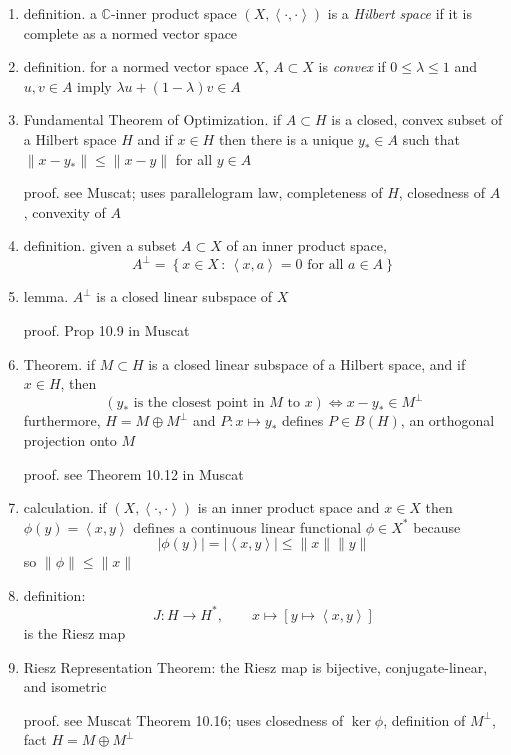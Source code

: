 \documentclass[11pt]{article}
\newcommand{\CC}{\mathbb{C}}
\newcommand{\ip}[2]{\ensuremath{\left<#1,#2\right>}}
\begin{document}
\begin{enumerate}
\item definition.  a $\CC$-inner product space $(X,\ip{\cdot}{\cdot})$ is a \emph{Hilbert space} if it is complete as a normed vector space

\item definition. for a normed vector space $X$, $A\subset X$ is \emph{convex} if $0\le \lambda \le 1$ and $u,v\in A$ imply $\lambda u + (1-\lambda) v\in A$

\item Fundamental Theorem of Optimization. if $A \subset H$ is a closed, convex subset of a Hilbert space $H$ and if $x\in H$ then there is a unique $y_* \in A$ such that $\|x-y_*\| \le \|x-y\|$ for all $y\in A$

proof. see Muscat; uses parallelogram law, completeness of $H$, closedness of $A$, convexity of $A$

\item definition.  given a subset $A\subset X$ of an inner product space,
    $$A^\perp = \left\{x\in X \,:\, \ip{x}{a}=0 \text{ for all } a \in A\right\}$$

\item lemma. $A^\perp$ is a closed linear subspace of $X$

proof. Prop 10.9 in Muscat

\item Theorem. if $M\subset H$ is a closed linear subspace of a Hilbert space, and if $x\in H$, then
    $$\left(y_* \text{ is the closest point in $M$ to } x\right) \iff x-y_* \in M^\perp$$
furthermore, $H=M\oplus M^\perp$ and $P:x\mapsto y_*$ defines $P\in B(H)$, an orthogonal projection onto $M$

proof. see Theorem 10.12 in Muscat

\item calculation. if $(X,\ip{\cdot}{\cdot})$ is an inner product space and $x\in X$ then $\phi(y) = \ip{x}{y}$ defines a continuous linear functional $\phi\in X^*$ because
    $$|\phi(y)| = |\ip{x}{y}| \le \|x\|\|y\|$$
so $\|\phi\|\le \|x\|$

\item definition:
    $$J:H \to H^*, \qquad x \mapsto \left[y\mapsto \ip{x}{y}\right]$$
is the Riesz map

\item Riesz Representation Theorem: the Riesz map is bijective, conjugate-linear, and isometric

proof. see Muscat Theorem 10.16; uses closedness of $\ker \phi$, definition of $M^\perp$, fact $H=M\oplus M^\perp$


\end{enumerate}
\end{document}
